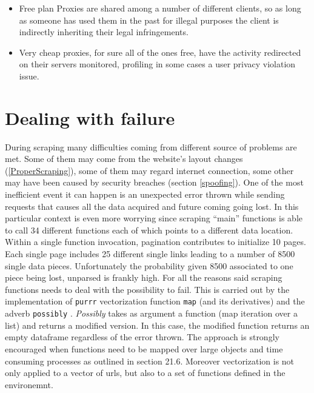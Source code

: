 \documentclass[
  12pt,
  a4paper,
  oneside]{book}
\newcommand{\passthrough}[1]{#1}
\providecommand{\tightlist}{%
  \setlength{\itemsep}{0pt}\setlength{\parskip}{0pt}}
\theoremstyle{definition}
\theoremstyle{definition}
\theoremstyle{definition}
\theoremstyle{remark}
\begin{document}
\begin{itemize}
\tightlist
\item
  Free plan Proxies are shared among a number of different clients, so as long as someone has used them in the past for illegal purposes the client is indirectly inheriting their legal infringements.
\item
  Very cheap proxies, for sure all of the ones free, have the activity redirected on their servers monitored, profiling in some cases a user privacy violation issue.
\end{itemize}

\hypertarget{possibly}{%
\section{Dealing with failure}\label{possibly}}

During scraping many difficulties coming from different source of problems are met. Some of them may come from the website's layout changes (\ref{ProperScraping}), some of them may regard internet connection, some other may have been caused by security breaches (section \ref{spoofing}).
One of the most inefficient event it can happen is an unexpected error thrown while sending requests that causes all the data acquired and future coming going lost. In this particular context is even more worrying since scraping ``main'' functions is able to call 34 different functions each of which points to a different data location. Within a single function invocation, pagination contributes to initialize 10 pages. Each single page includes 25 different single links leading to a number of 8500 single data pieces. Unfortunately the probability given 8500 associated to one piece being lost, unparsed is frankly high.
For all the reasons said scraping functions needs to deal with the possibility to fail. This is carried out by the implementation of \passthrough{\lstinline!purrr!} vectorization function \passthrough{\lstinline!map!} (and its derivatives) and the adverb \passthrough{\lstinline!possibly!} \citet{possibly}. \emph{Possibly} takes as argument a function (map iteration over a list) and returns a modified version. In this case, the modified function returns an empty dataframe regardless of the error thrown. The approach is strongly encouraged when functions need to be mapped over large objects and time consuming processes as outlined in \citet{Rdatascience} section 21.6. Moreover vectorization is not only applied to a vector of urls, but also to a set of functions defined in the environemnt.
\end{document}

